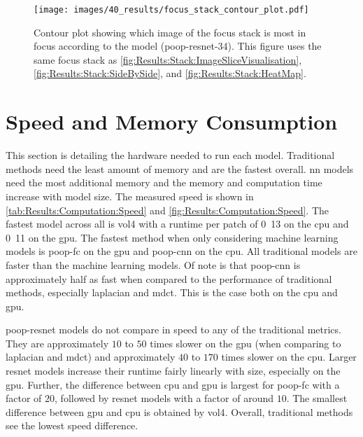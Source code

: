 \begin{figure}
    \centering
    \texttt{[image: images/40\_results/focus\_stack\_contour\_plot.pdf]}
    \caption[Best index contours]{Contour plot showing which image of the focus stack is most in focus according to the model (\acs{poop}-\acs{resnet}-34). This figure uses the same focus stack as \autoref{fig:Results:Stack:ImageSliceVisualisation}, \autoref{fig:Results:Stack:SideBySide}, and \autoref{fig:Results:Stack:HeatMap}.}
    \label{fig:Results:Stack:ContourPlot}
\end{figure}

\FloatBarrier

\section{Speed and Memory Consumption}
\label{sec:Results:Computation}

This section is detailing the hardware needed to run each model. Traditional methods need the least amount of memory and are the fastest overall. \Acl{nn} models need the most additional memory and the memory and computation time increase with model size. The measured speed is shown in  \autoref{tab:Results:Computation:Speed} and \autoref{fig:Results:Computation:Speed}.
The fastest model across all is \ac{vol4} with a runtime per patch of \unit{0.13}{\milli\second} on the \ac{cpu} and \unit{0.11}{\milli\second} on the \ac{gpu}. The fastest method when only considering machine learning models is \ac{poop}-\ac{fc} on the \ac{gpu} and \ac{poop}-\ac{cnn} on the \ac{cpu}. All traditional models are faster than the machine learning models. Of note is that \ac{poop}-\ac{cnn} is approximately half as fast when compared to the performance of traditional methods, especially \ac{laplacian} and \ac{mdct}. This is the case both on the \ac{cpu} and \ac{gpu}. 

\ac{poop}-\ac{resnet} models do not compare in speed to any of the traditional metrics. They are approximately $10$ to $50$ times slower on the \ac{gpu} (when comparing to \ac{laplacian} and \ac{mdct}) and approximately $40$ to $170$ times slower on the \ac{cpu}. Larger \ac{resnet} models increase their runtime fairly linearly with size, especially on the \ac{gpu}. Further, the difference between \ac{cpu} and \ac{gpu} is largest for \ac{poop}-\ac{fc} with a factor of $20$, followed by \ac{resnet} models with a factor of around $10$. The smallest difference between \ac{gpu} and \ac{cpu} is obtained by \ac{vol4}. Overall, traditional methods see the lowest speed difference.

